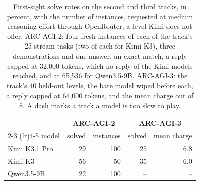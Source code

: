 \begin{table}[h]
\centering
\small
\caption{First-sight solve rates on the second and third tracks, in percent, with the number of instances, requested at medium reasoning effort through OpenRouter, a level Kimi does not offer. ARC-AGI-2: four fresh instances of each of the track's 25 stream tasks (two of each for Kimi-K3), three demonstrations and one answer, an exact match, a reply capped at 32{,}000 tokens, which no reply of the Kimi models reached, and at 65{,}536 for Qwen3.5-9B. ARC-AGI-3: the track's 40 held-out levels, the bare model wiped before each, a reply capped at 64{,}000 tokens, and the mean charge out of 8. A dash marks a track a model is too slow to play.}
\label{tab:first-sight}
\begin{tabular}{lrrrr}
\toprule
& \multicolumn{2}{c}{ARC-AGI-2} & \multicolumn{2}{c}{ARC-AGI-3} \\
\cmidrule(lr){2-3} \cmidrule(lr){4-5}
model & solved & instances & solved & mean charge \\
\midrule
Kimi K3.1 Pro & 29 & 100 & 25 & 6.8 \\
Kimi-K3 & 56 & 50 & 35 & 6.0 \\
Qwen3.5-9B & 22 & 100 & -- & -- \\
\bottomrule
\end{tabular}
\end{table}

